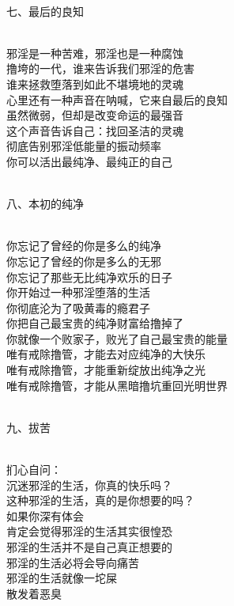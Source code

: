 \begin{poem}
\begin{adjustwidth}{-4em}{-4em}
\begin{multicols}{2}
\begin{center}
                ~\\

                七、最后的良知

                ~\\

                邪淫是一种苦难，邪淫也是一种腐蚀 \\ 撸垮的一代，谁来告诉我们邪淫的危害 \\ 谁来拯救堕落到如此不堪境地的灵魂 \\ 心里还有一种声音在呐喊，它来自最后的良知 \\ 虽然微弱，但却是改变命运的最强音 \\ 这个声音告诉自己：找回圣洁的灵魂 \\ 彻底告别邪淫低能量的振动频率 \\ 你可以活出最纯净、最纯正的自己

                ~\\

                八、本初的纯净

                ~\\

                你忘记了曾经的你是多么的纯净 \\ 你忘记了曾经的你是多么的无邪 \\ 你忘记了那些无比纯净欢乐的日子 \\ 你开始过一种邪淫堕落的生活 \\ 你彻底沦为了吸黄毒的瘾君子 \\ 你把自己最宝贵的纯净财富给撸掉了 \\ 你就像一个败家子，败光了自己最宝贵的能量 \\ 唯有戒除撸管，才能去对应纯净的大快乐 \\ 唯有戒除撸管，才能重新绽放出纯净之光 \\ 唯有戒除撸管，才能从黑暗撸坑重回光明世界

                ~\\

                九、拔苦

                ~\\

                扪心自问： \\ 沉迷邪淫的生活，你真的快乐吗？ \\ 这种邪淫的生活，真的是你想要的吗？ \\ 如果你深有体会 \\ 肯定会觉得邪淫的生活其实很惶恐 \\ 邪淫的生活并不是自己真正想要的 \\ 邪淫的生活必将会导向痛苦 \\ 邪淫的生活就像一坨屎 \\ 散发着恶臭


\end{center}
\end{multicols}
\end{adjustwidth}
\end{poem}
